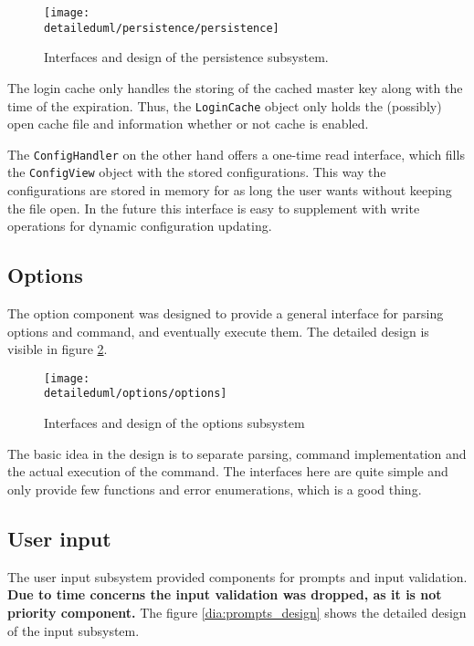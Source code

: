 \begin{figure}[H]
    \centering
    \centerline{\texttt{[image: \\detaileduml/persistence/persistence]}}
    \caption{Interfaces and design of the persistence subsystem.}
    \label{dia:persistence}
\end{figure}

The login cache only handles the storing of the cached master key along with the
time of the expiration. Thus, the \texttt{LoginCache} object only holds the
(possibly) open cache file and information whether or not cache is enabled.

The \texttt{ConfigHandler} on the other hand offers a one-time read interface,
which fills the \texttt{ConfigView} object with the stored configurations. This
way the configurations are stored in memory for as long the user wants without
keeping the file open. In the future this interface is easy to supplement with
write operations for dynamic configuration updating.

\subsection{Options}

The option component was designed to provide a general interface for parsing
options and command, and eventually execute them. The detailed design is visible
in figure \ref{dia:options_design}.

\begin{figure}[H]
    \centering
    \centerline{\texttt{[image: \\detaileduml/options/options]}}
    \caption{Interfaces and design of the options subsystem}
    \label{dia:options_design}
\end{figure}

The basic idea in the design is to separate parsing, command implementation
and the actual execution of the command. The interfaces here are quite simple
and only provide few functions and error enumerations, which is a good thing.

\subsection{User input}

The user input subsystem provided components for prompts and input validation.
\textbf{Due to time concerns the input validation was dropped, as it is not
priority component.} The figure \ref{dia:prompts_design} shows the detailed
design of the input subsystem.

